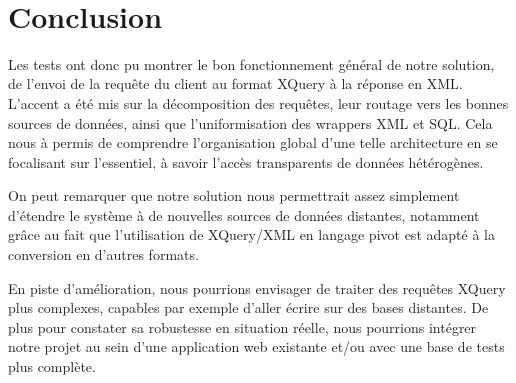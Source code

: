 \documentclass[a4paper,10pt]{article}
\begin{document}
~~\\
\newpage
\section{Conclusion}
Les tests ont donc pu montrer le bon fonctionnement général de notre solution, de l'envoi de la requête du client au format XQuery à la réponse en XML. L'accent a été mis sur la décomposition des requêtes, leur routage vers les bonnes sources de données, ainsi que l'uniformisation des wrappers XML et SQL. Cela nous à permis de comprendre l'organisation global d'une telle architecture en se focalisant sur l'essentiel, à savoir l'accès transparents de données hétérogènes.

On peut remarquer que notre solution nous permettrait assez simplement d'étendre le système à de nouvelles sources de données distantes, notamment grâce au fait que l'utilisation de XQuery/XML en langage pivot est adapté à la conversion en d'autres formats.

En piste d'amélioration, nous pourrions envisager de traiter des requêtes XQuery plus complexes, capables par exemple d'aller écrire sur des bases distantes. De plus pour constater sa robustesse en situation réelle, nous pourrions intégrer notre projet au sein d'une application web existante et/ou avec une base de tests plus complète.
\end{document}
